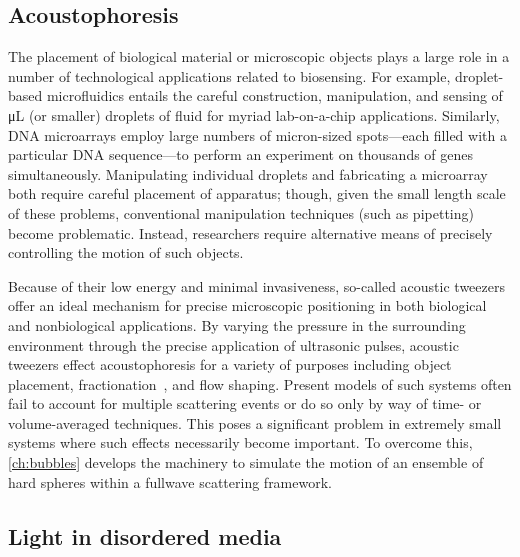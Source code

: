 \subsection{Acoustophoresis}

The placement of biological material or microscopic objects plays a large role in a number of technological applications related to biosensing.
For example, droplet-based microfluidics entails the careful construction, manipulation, and sensing of \si{\micro\liter} (or smaller) droplets of fluid for myriad lab-on-a-chip applications.
Similarly, DNA microarrays employ large numbers of micron-sized spots---each filled with a particular DNA sequence---to perform an experiment on thousands of genes simultaneously.
Manipulating individual droplets and fabricating a microarray both require careful placement of apparatus; though, given the small length scale of these problems, conventional manipulation techniques (such as pipetting) become problematic.
Instead, researchers require alternative means of precisely controlling the motion of such objects.

Because of their low energy and minimal invasiveness, so-called acoustic tweezers offer an ideal mechanism for precise microscopic positioning in both biological and nonbiological applications.
By varying the pressure in the surrounding environment through the precise application of ultrasonic pulses, acoustic tweezers effect acoustophoresis for a variety of purposes including object placement, fractionation~\cite{Petersson2007}, and flow shaping.
Present models of such systems often fail to account for multiple scattering events or do so only by way of time- or volume-averaged techniques.
This poses a significant problem in extremely small systems where such effects necessarily become important.
To overcome this, \cref{ch:bubbles} develops the machinery to simulate the motion of an ensemble of hard spheres within a fullwave scattering framework.

\subsection{Light in disordered media}

